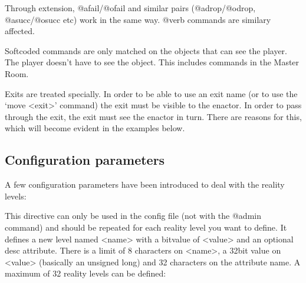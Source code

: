 \documentclass[letterpaper,10pt,english]{sphinxmanual}
\begin{document}
\sphinxAtStartPar
Through extension, @afail/@ofail and similar pairs (@adrop/@odrop,
@asucc/@osucc etc) work in the same way. @verb commands are similary
affected.

\sphinxAtStartPar
Softcoded commands are only matched on the objects that can see the player.
The player doesn’t have to see the object. This includes commands in the
Master Room.

\sphinxAtStartPar
Exits are treated specially. In order to be able to use an exit name (or to
use the ‘move \textless{}exit\textgreater{}’ command) the exit must be visible to the enactor. In
order to pass through the exit, the exit must see the enactor in turn. There
are reasons for this, which will become evident in the examples below.


\subsection{Configuration parameters}
\label{\detokenize{advanced:configuration-parameters}}
\sphinxAtStartPar
A few configuration parameters have been introduced to deal with the reality
levels:

\begin{sphinxVerbatim}[commandchars=\\\{\}]
   \PYG{p}{[}  \PYG{p}{]}
\end{sphinxVerbatim}

\sphinxAtStartPar
This directive can only be used in the config file (not with the @admin
command) and should be repeated for each reality level you want to define.
It defines a new level named \textless{}name\textgreater{} with a bitvalue of \textless{}value\textgreater{} and an
optional desc attribute. There is a limit of 8 characters on \textless{}name\textgreater{}, a
32\sphinxhyphen{}bit value on \textless{}value\textgreater{} (basically an unsigned long) and 32 characters on
the attribute name. A maximum of 32 reality levels can be defined:

\begin{sphinxVerbatim}[commandchars=\\\{\}]
 
 
 
 
 
 
 
 
\end{sphinxVerbatim}
\end{document}
